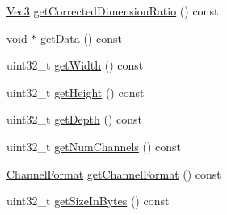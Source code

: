 \begin{DoxyCompactItemize}
\item 
\hyperlink{class_verdi_1_1_vec3}{\-Vec3} \hyperlink{class_verdi_1_1_data_set_aff74d0fdf0e520b7405eb44d4b9ad447}{get\-Corrected\-Dimension\-Ratio} () const 
\item 
void $\ast$ \hyperlink{class_verdi_1_1_data_set_a8bbef508432add282b45a2e6fca37166}{get\-Data} () const 
\item 
uint32\-\_\-t \hyperlink{class_verdi_1_1_data_set_a99551cb4eb7fc7fe4a11d48c67851b24}{get\-Width} () const 
\item 
uint32\-\_\-t \hyperlink{class_verdi_1_1_data_set_abe999031576897e8171397836194ef95}{get\-Height} () const 
\item 
uint32\-\_\-t \hyperlink{class_verdi_1_1_data_set_a3f71f2d58fb65df768f936cf0f1fcf65}{get\-Depth} () const 
\item 
uint32\-\_\-t \hyperlink{class_verdi_1_1_data_set_a65b7f67ddbb9b5974bb1e119236a4e8c}{get\-Num\-Channels} () const 
\item 
\hyperlink{class_verdi_1_1_data_set_abd6d238fa4dff1b0ea6abd391d14ed64}{\-Channel\-Format} \hyperlink{class_verdi_1_1_data_set_ac93bcca23f3d6feeabea75ac3d73f866}{get\-Channel\-Format} () const 
\item 
uint32\-\_\-t \hyperlink{class_verdi_1_1_data_set_a2f43e4e7e6ee57fc4d91a9e2f40e5f5f}{get\-Size\-In\-Bytes} () const 
\end{DoxyCompactItemize}
